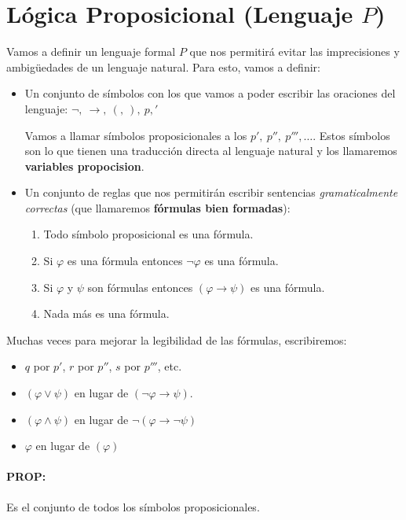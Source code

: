 	\section{Lógica Proposicional (Lenguaje $P$)}
	Vamos a definir un lenguaje formal $P$ que nos permitirá evitar las imprecisiones y ambigüedades de un lenguaje natural. Para esto, vamos a definir:
	
	\begin{itemize}
		\item Un conjunto de símbolos con los que vamos a poder escribir las oraciones del lenguaje: $\lnot,~\rightarrow,~(,~),~p, '$
		
		Vamos a llamar símbolos proposicionales a los $p',~p'',~p''',\dots$. Estos símbolos son lo que tienen una traducción directa al lenguaje natural y los llamaremos \textbf{variables propocision}.
\item Un conjunto de reglas que nos permitirán escribir sentencias \textit{gramaticalmente correctas} (que llamaremos \textbf{fórmulas bien formadas}):
		\begin{enumerate}
			\item Todo símbolo proposicional es una fórmula.
			\item Si $\varphi$ es una fórmula entonces $\lnot\varphi$ es una fórmula.
			\item Si $\varphi$ y $\psi$ son fórmulas entonces $(\varphi \rightarrow \psi)$ es una fórmula.
			\item Nada más es una fórmula.
		\end{enumerate}
	\end{itemize}

Muchas veces para mejorar la legibilidad de las fórmulas, escribiremos:

\begin{itemize}
	\item $q$ por $p'$, $r$ por $p''$, $s$ por $p'''$, etc.
	\item $(\varphi \lor \psi)$ en lugar de $(\lnot\varphi\rightarrow\psi)$.
	\item $(\varphi \land \psi)$ en lugar de $\lnot(\varphi\rightarrow\lnot\psi)$
	\item $\varphi$ en lugar de $(\varphi)$
\end{itemize}

\paragraph{PROP:} Es el conjunto de todos los símbolos proposicionales.

